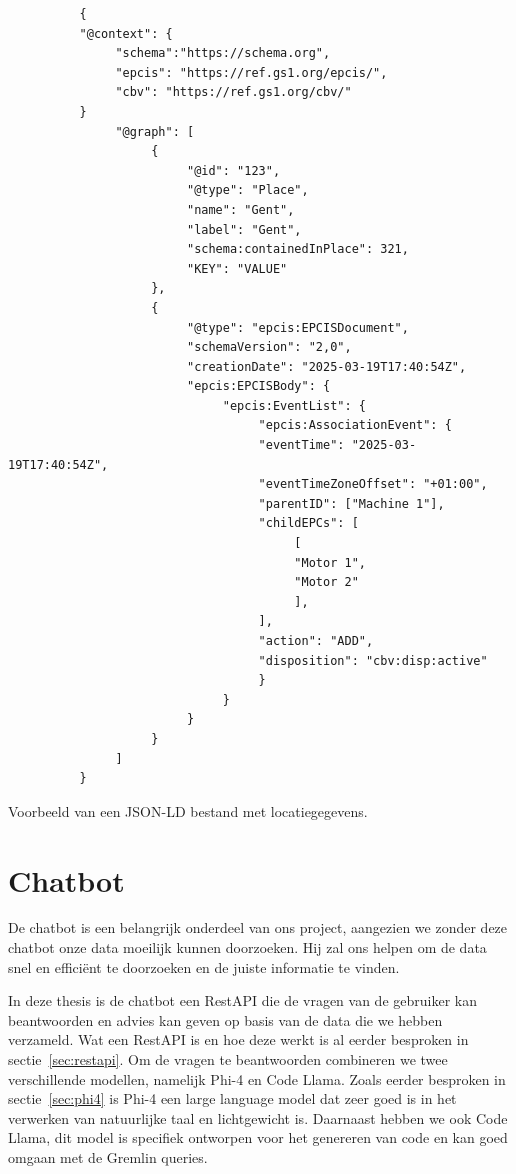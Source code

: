 \begin{listing}[h]
     \begin{verbatim}
          {
          "@context": {
               "schema":"https://schema.org",
               "epcis": "https://ref.gs1.org/epcis/",
               "cbv": "https://ref.gs1.org/cbv/"
          }
               "@graph": [
                    {
                         "@id": "123",
                         "@type": "Place",
                         "name": "Gent",
                         "label": "Gent",
                         "schema:containedInPlace": 321,
                         "KEY": "VALUE"
                    },
                    {
                         "@type": "epcis:EPCISDocument",
                         "schemaVersion": "2,0",
                         "creationDate": "2025-03-19T17:40:54Z",
                         "epcis:EPCISBody": {
                              "epcis:EventList": {
                                   "epcis:AssociationEvent": {
                                   "eventTime": "2025-03-19T17:40:54Z",
                                   "eventTimeZoneOffset": "+01:00",
                                   "parentID": ["Machine 1"],
                                   "childEPCs": [
                                        [
                                        "Motor 1",
                                        "Motor 2"
                                        ],
                                   ],
                                   "action": "ADD",
                                   "disposition": "cbv:disp:active"
                                   }
                              }
                         }
                    }
               ]
          }
     \end{verbatim}
     \caption[Voorbeeld JSON-LD bestand]{\label{fig:jsonld}Voorbeeld van een JSON-LD bestand met locatiegegevens.}
\end{listing}


\section{Chatbot}
De chatbot is een belangrijk onderdeel van ons project, aangezien we zonder deze chatbot onze data moeilijk kunnen doorzoeken.
Hij zal ons helpen om de data snel en efficiënt te doorzoeken en de juiste informatie te vinden.

In deze thesis is de chatbot een RestAPI die de vragen van de gebruiker kan beantwoorden en advies kan geven op basis van de data die we hebben verzameld.
Wat een RestAPI is en hoe deze werkt is al eerder besproken in sectie~\ref{sec:restapi}.
Om de vragen te beantwoorden combineren we twee verschillende modellen, namelijk Phi-4 en Code Llama. 
Zoals eerder besproken in sectie~\ref{sec:phi4} is Phi-4 een large language model dat zeer goed is in het verwerken van natuurlijke taal en lichtgewicht is.
Daarnaast hebben we ook Code Llama, dit model is specifiek ontworpen voor het genereren van code en kan goed omgaan met de Gremlin queries.

